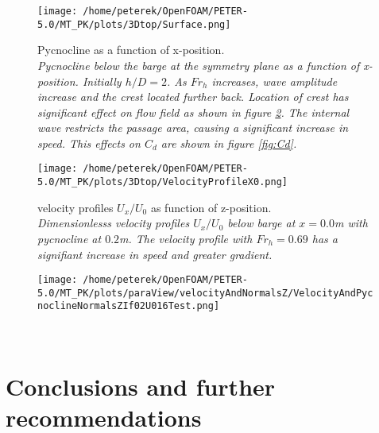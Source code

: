 \documentclass[a4paper, 12pt]{report}
\begin{document}
\begin{minipage}[t]{.45\textwidth} 
	\begin{figure}[H]
		\centering
		\texttt{[image: /home/peterek/OpenFOAM/PETER-5.0/MT\_PK/plots/3Dtop/Surface.png]}
		\caption{Pycnocline as a function of x-position. \\ \textit{Pycnocline below the barge at the symmetry plane as a function of x-position. Initially $h/D=2$. As $Fr_h$ increases, wave amplitude increase and the crest located further back. Location of crest has significant effect on flow field as shown in figure \ref{fig:velocityProfileX0}. The internal wave restricts the passage area, causing a significant increase in speed. This effects on $C_d$ are shown in figure \ref{fig:Cd}.}}
		\label{fig:eta1}
	\end{figure}
\end{minipage}\hfill
\vspace{2ex}
\begin{minipage}[t]{.45\textwidth}
	\begin{figure}[H]
		\centering
		\texttt{[image: /home/peterek/OpenFOAM/PETER-5.0/MT\_PK/plots/3Dtop/VelocityProfileX0.png]}
		\caption{velocity profiles $U_x/U_0$ as function of z-position. \\ \textit{Dimensionlesss velocity profiles $U_x/U_0$ below barge at $x = 0.0$m with pycnocline at $0.2$m. The velocity profile with $Fr_h = 0.69$ has a signifiant increase in speed and greater gradient.}}
		\label{fig:velocityProfileX0}
	\end{figure}
\end{minipage}\hfill
\vspace{2ex}

\begin{figure}[H]
	\centering
	\texttt{[image: /home/peterek/OpenFOAM/PETER-5.0/MT\_PK/plots/paraView/velocityAndNormalsZ/VelocityAndPycnoclineNormalsZIf02U016Test.png]}
	\caption{ \\ \textit{}}
	\label{fig:velocityAndPycnoclineIf02U016Test}
\end{figure}

\chapter{Conclusions and further recommendations}
\end{document}
